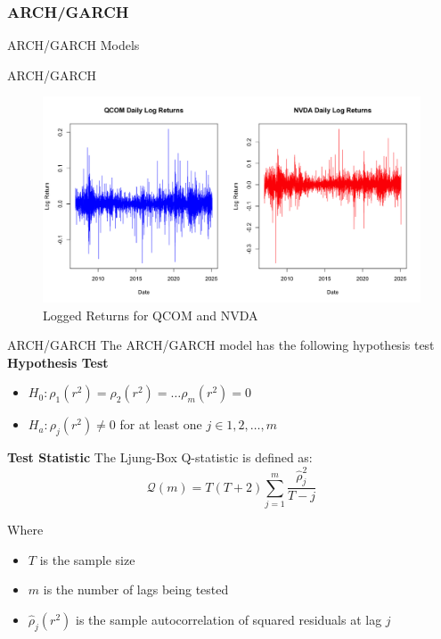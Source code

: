 \documentclass{beamer}[9pt]
\begin{document}
\begin{frame}
	\frametitle{ARCH/GARCH}
	
	\centering
	{\Large ARCH/GARCH Models}
\end{frame}

\begin{frame}{ARCH/GARCH}
	\begin{figure}[!h]
		\centering
		\includegraphics[width=0.8\linewidth]{plots/log_returns_QCOM_NVDA.png}
		\caption{Logged Returns for QCOM and NVDA}
	\end{figure}
\end{frame}

\begin{frame}{ARCH/GARCH}
	The ARCH/GARCH model has the following hypothesis test
	\newline
	\textbf{Hypothesis Test}
	\begin{itemize}
		\item $H_0: \rho_1(r^2)=\rho_2(r^2)=\dots\rho_m(r^2)=0$ 
		\item $H_a:\rho_j(r^2)\neq 0$ for at least one $j\in 1,2,\ldots,m$
	\end{itemize}
	\par
	\textbf{Test Statistic}
	\newline
	The Ljung-Box Q-statistic is defined as:
		\[
		\mathcal{Q}(m)=T(T+2)\sum_{j=1}^{m}\frac{\hat{\rho}_j^2}{T-j}
		\]
		
	Where
	\begin{itemize}
		\item $T$ is the sample size
		\item $m$ is the number of lags being tested
		\item $\hat{\rho}_j(r^2)$ is the sample autocorrelation of squared residuals at lag $j$
	\end{itemize}
\end{frame}
\end{document}
